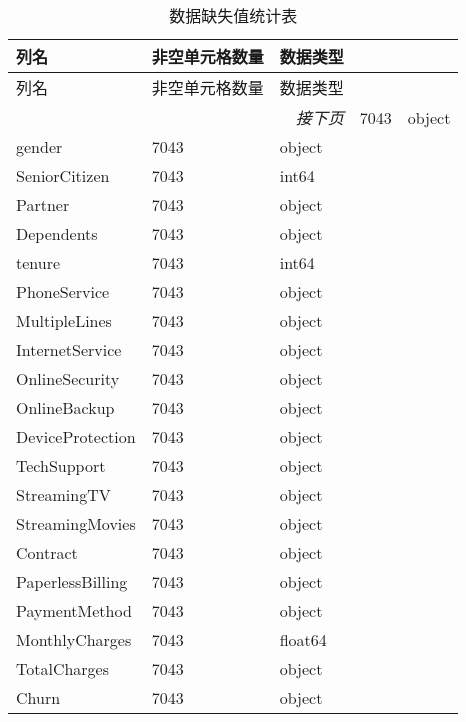 \documentclass[a4paper,AutoFakeBold={2.7}]{ctexart} %
\begin{document}
\begin{longtable}{p{4cm}<{\centering} p{4cm}<{\centering} p{4cm}<{\centering}}
    \caption{数据缺失值统计表}\label{数据缺失值统计表} \\
    
    \toprule
    列名 & 非空单元格数量 & 数据类型 \\
    \midrule
    \endfirsthead %

    \toprule
    列名 & 非空单元格数量 & 数据类型 \\
    \midrule
    \endhead %

    \bottomrule
    \multicolumn{3}{r}{\textit{接下页}} %
    \endfoot %

    \bottomrule
    \endlastfoot %
	
    customerID & 7043 & object \\
    gender & 7043 & object \\
    SeniorCitizen & 7043 & int64 \\
    Partner & 7043 & object \\
    Dependents & 7043 & object \\
    tenure & 7043 & int64 \\
    PhoneService & 7043 & object \\
    MultipleLines & 7043 & object \\
    InternetService & 7043 & object \\
    OnlineSecurity & 7043 & object \\
    OnlineBackup & 7043 & object \\
    DeviceProtection & 7043 & object \\
    TechSupport & 7043 & object \\
    StreamingTV & 7043 & object \\
    StreamingMovies & 7043 & object \\
    Contract & 7043 & object \\
    PaperlessBilling & 7043 & object \\
    PaymentMethod & 7043 & object \\
    MonthlyCharges & 7043 & float64 \\
    TotalCharges & 7043 & object \\
    Churn & 7043 & object \\
\end{longtable}
\end{document}
